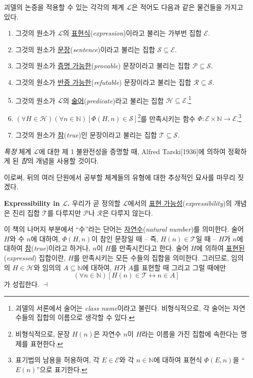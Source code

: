 \documentclass[12pt]{paper}
\newenvironment{context}[1][]{\noindent \textbf{{#1}.}}{\hfill $ \dashv $}
\begin{document}
  괴델의 논증을 적용할 수 있는 각각의 체계 $\mathcal{L}$은 적어도 다음과 같은 물건들을 가지고 있다.
  \begin{enumerate}
    \item 그것의 원소가 $\mathcal{L}$의 \underline{표현식}(\textit{expression})이라고 불리는 가부번 집합 $\mathcal{E}$.
    \item 그것의 원소가 \underline{문장}(\textit{sentence})이라고 불리는 집합 $\mathcal{S} \subseteq \mathcal{E}$.
    \item 그것의 원소가 \underline{증명 가능한}(\textit{provable}) 문장이라고 불리는 집합 $\mathcal{P} \subseteq \mathcal{S}$.
    \item 그것의 원소가 \underline{반증 가능한}(\textit{refutable}) 문장이라고 불리는 집합 $\mathcal{R} \subseteq \mathcal{S}$.
    \item 그것의 원소가 $\mathcal{L}$의 \underline{술어}(\textit{predicate})라고 불리는 집합 $\mathcal{H} \subseteq \mathcal{E}$.\footnote
    {
      괴델의 서론에서 술어는 \textit{class name}이라고 불린다.
      비형식적으로, 각 술어는 자연수들의 집합의 이름으로 생각할 수 있다.
    }
    \item $ \left( \forall H \in \mathcal{H} \right) \left( \forall n \in \mathbb{N} \right) \left[ \Phi \left( H , n \right) \in \mathcal{S} \right] $\footnote
    {
      비형식적으로, 문장 $H \left( n \right)$은 자연수 $n$이 $H$라는 이름을 가진 집합에 속한다는 명제를 표현한다.
    }를 만족시키는 함수 $ \Phi : \mathcal{E} \times \mathbb{N} \to \mathcal{E} $.\footnote
    {
      표기법의 남용을 허용하여, 각 $E \in \mathcal{E}$와 각 $n \in \mathbb{N}$에 대하여 표현식 $\Phi \left( E , n \right)$을 ``$ E \left( n \right) $''으로 표기한다.
    }
    \item 그것의 원소가 \underline{참}(\textit{true})인 문장이라고 불리는 집합 $\mathcal{T} \subseteq \mathcal{S}$.
  \end{enumerate}
  \textit{특정} 체계 $\mathcal{L}$에 대한 제 1 불완전성을 증명할 때,
  Alfred Tarski[1936]에 의하여 정확하게 된 \textit{참}의 개념을 사용할 것이다.

  이로써, 뒤의 여러 단원에서 공부할 체계들의 유형에 대한 추상적인 묘사를 마무리 짓겠다.

  \begin{context}[Expressibility in $\mathcal{L}$]
    우리가 곧 정의할 $\mathcal{L}$에서의 \underline{표현 가능성}(\textit{expressibility})의 개념은 진리 집합 $\mathcal{T}$를 다루지만 $\mathcal{P}$나 $\mathcal{R}$은 다루지 않는다.

    이 책의 나머지 부분에서 ``수''라는 단어는 \underline{자연수}(\textit{natural number})를 의미한다.
    술어 $H$와 수 $n$에 대하여, $\Phi \left( H , n \right)$이 참인 문장일 때 --
    즉, $ H \left( n \right) \in \mathcal{T} $일 때 --
    $H$가 $n$에 대하여 \underline{참}(\textit{true})이라고 하거나,
    $n$이 $H$를 만족시킨다고 한다.
    술어 $H$에 의하여 \underline{표현된}(\textit{expressed}) 집합이란, $H$를 만족시키는 모든 수들의 집합을 의미한다.
    그러므로, 임의의 $H \in \mathcal{H}$와 임의의 $A \subseteq \mathbb{N}$에 대하여,
    $H$가 $A$를 표현할 때 그리고 그럴 때에만 $$ \left( \forall n \in \mathbb{N} \right) \left[ H \left( n \right) \in \mathcal{T} \leftrightarrow n \in A \right] $$가 성립한다.
  \end{context}
\end{document}
